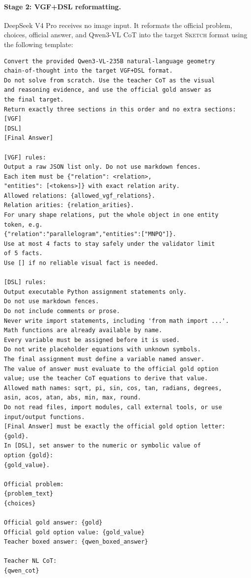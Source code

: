 \documentclass{article}
\newcommand{\sketch}{\textsc{Sketch}}
\begin{document}
\paragraph{Stage 2: VGF+DSL reformatting.}
DeepSeek V4 Pro receives no image input. It reformats the official problem, choices, official answer, and Qwen3-VL CoT into the target \sketch{} format using the following template:
\begin{verbatim}
Convert the provided Qwen3-VL-235B natural-language geometry
chain-of-thought into the target VGF+DSL format.
Do not solve from scratch. Use the teacher CoT as the visual
and reasoning evidence, and use the official gold answer as
the final target.
Return exactly three sections in this order and no extra sections:
[VGF]
[DSL]
[Final Answer]

[VGF] rules:
Output a raw JSON list only. Do not use markdown fences.
Each item must be {"relation": <relation>,
"entities": [<tokens>]} with exact relation arity.
Allowed relations: {allowed_vgf_relations}.
Relation arities: {relation_arities}.
For unary shape relations, put the whole object in one entity
token, e.g.
{"relation":"parallelogram","entities":["MNPQ"]}.
Use at most 4 facts to stay safely under the validator limit
of 5 facts.
Use [] if no reliable visual fact is needed.

[DSL] rules:
Output executable Python assignment statements only.
Do not use markdown fences.
Do not include comments or prose.
Never write import statements, including 'from math import ...'.
Math functions are already available by name.
Every variable must be assigned before it is used.
Do not write placeholder equations with unknown symbols.
The final assignment must define a variable named answer.
The value of answer must evaluate to the official gold option
value; use the teacher CoT equations to derive that value.
Allowed math names: sqrt, pi, sin, cos, tan, radians, degrees,
asin, acos, atan, abs, min, max, round.
Do not read files, import modules, call external tools, or use
input/output functions.
[Final Answer] must be exactly the official gold option letter:
{gold}.
In [DSL], set answer to the numeric or symbolic value of
option {gold}:
{gold_value}.

Official problem:
{problem_text}
{choices}

Official gold answer: {gold}
Official gold option value: {gold_value}
Teacher boxed answer: {qwen_boxed_answer}

Teacher NL CoT:
{qwen_cot}
\end{verbatim}
\end{document}
